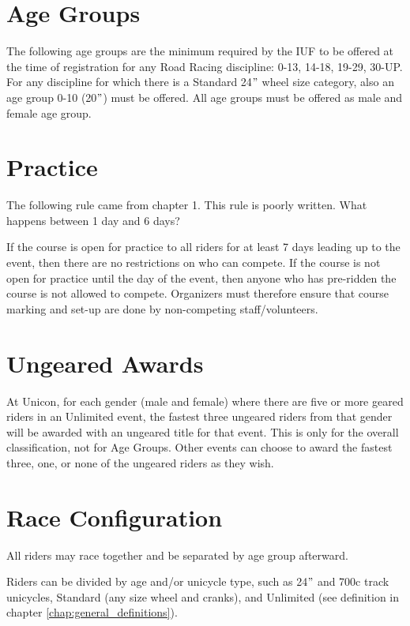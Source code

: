 \section{Age Groups}

The following age groups are the minimum required by the IUF to be offered at the time of registration for any Road Racing discipline: 0-13, 14-18, 19-29, 30-UP.
For any discipline for which there is a Standard 24$"$ wheel size category, also an age group 0-10 (20$"$) must be offered.
All age groups must be offered as male and female age group.

\section{Practice}

\begin{comment2016}
The following rule came from chapter 1. This rule is poorly written.  What happens between 1 day and 6 days?
\end{comment2016}

If the course is open for practice to all riders for at least 7 days leading up to the event, then there are no restrictions on who can compete. 
If the course is not open for practice until the day of the event, then anyone who has pre-ridden the course is not allowed to compete. 
Organizers must therefore ensure that course marking and set-up are done by non-competing staff/volunteers.

\section{Ungeared Awards}
At Unicon, for each gender (male and female) where there are five or more geared riders in an Unlimited event, the fastest three ungeared riders from that gender will be awarded with an ungeared title for that event.
This is only for the overall classification, not for Age Groups.
Other events can choose to award the fastest three, one, or none of the ungeared riders as they wish.

\section{Race Configuration}

All riders may race together and be separated by age group afterward.

Riders can be divided by age and/or unicycle type, such as 24$"$ and 700c
track unicycles, Standard (any size wheel and cranks), and Unlimited (see
definition in chapter \ref{chap:general_definitions}).


